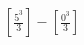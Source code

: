 \documentclass[preview]{standalone}
\begin{document}
\begin{align*}
\left[\frac{5^3}{3}\right] - \left[\frac{0^3}{3}\right]
\end{align*}
\end{document}
